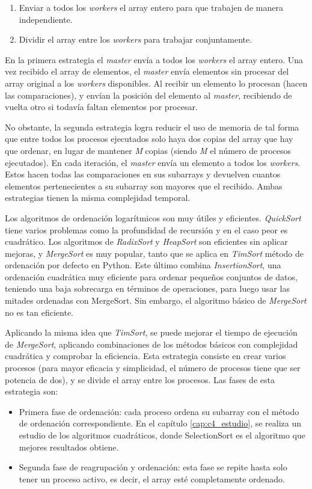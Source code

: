 	\begin{enumerate}
		\item Enviar a todos los \textit{workers} el array entero para que trabajen de manera independiente.
		\item Dividir el array entre los \textit{workers} para trabajar conjuntamente.
	\end{enumerate}
	
	En la primera estrategia el \textit{master} envía a todos los \textit{workers} el array entero. Una vez recibido el array de elementos, el \textit{master} envía elementos sin procesar del array original a los \textit{workers} disponibles. Al recibir un elemento lo procesan (hacen las comparaciones), y envían la posición del elemento al \textit{master}, recibiendo de vuelta otro si todavía faltan elementos por procesar. 
	
	No obstante, la segunda estrategia logra reducir el uso de memoria de tal forma que entre todos los procesos ejecutados solo haya dos copias del array que hay que ordenar, en lugar de mantener \textit{M} copias (siendo \textit{M} el número de procesos ejecutados). En cada iteración, el \textit{master} envía un elemento a todos los \textit{workers}. Estos hacen todas las comparaciones en sus subarrays y devuelven cuantos elementos pertenecientes a su subarray son mayores que el recibido. Ambas estrategias tienen la misma complejidad temporal.



	Los algoritmos de ordenación logarítmicos son muy útiles y eficientes. \textit{QuickSort} tiene varios problemas como la profundidad de recursión y en el caso peor es cuadrático. Los algoritmos de \textit{RadixSort} y \textit{HeapSort} son eficientes sin aplicar mejoras, y \textit{MergeSort} es muy popular, tanto que se aplica en \textit{TimSort}\cite{auger2015merge} método de ordenación por defecto en Python. Este último combina \textit{InsertionSort}, una ordenación cuadrática muy eficiente para ordenar pequeños conjuntos de datos, teniendo una baja sobrecarga en términos de operaciones, para luego usar las mitades ordenadas con MergeSort. Sin embargo, el algoritmo básico de \textit{MergeSort} no es tan eficiente.
	
	Aplicando la misma idea que \textit{TimSort}, se puede mejorar el tiempo de ejecución de \textit{MergeSort}, aplicando combinaciones de los métodos básicos con complejidad cuadrática y comprobar la eficiencia. Esta estrategia consiste en crear varios procesos (para mayor eficacia y simplicidad, el número de procesos tiene que ser potencia de dos), y se divide el array entre los procesos. Las fases de esta estrategia son:
	\begin{itemize}
		\item Primera fase de ordenación: cada proceso ordena su subarray con el método de ordenación correspondiente. En el capítulo \ref{cap:c4_estudio}, se realiza un estudio de los algoritmos cuadráticos, donde SelectionSort es el algoritmo que mejores resultados obtiene.
		\item Segunda fase de reagrupación y ordenación: esta fase se repite hasta solo tener un proceso activo, es decir, el array esté completamente ordenado.
	\end{itemize}
	
